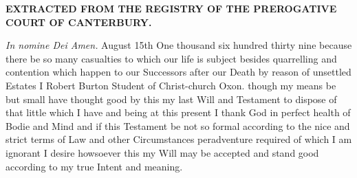 \begin{displayquote}
{\scriptsize{}
\textbf{EXTRACTED FROM THE REGISTRY OF THE PREROGATIVE COURT OF CANTERBURY.}

\textlatin{\emph{In nomine Dei Amen.}} August 15th One thousand six hundred thirty nine because there be so many casualties to which our life is subject besides quarrelling and contention which happen to our Successors after our Death by reason of unsettled Estates I Robert Burton Student of Christ-church Oxon. though my means be but small have thought good by this my last Will and Testament to dispose of that little which I have and being at this present I thank God in perfect health of Bodie and Mind and if this Testament be not so formal according to the nice and strict terms of Law and other Circumstances peradventure required of which I am ignorant I desire howsoever this my Will may be accepted and stand good according to my true Intent and meaning.

}
\end{displayquote}
